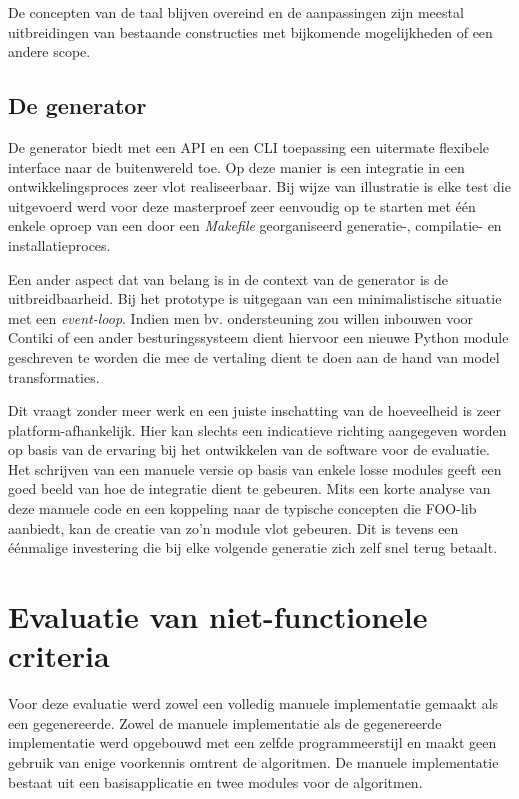 De concepten van de taal blijven overeind en de aanpassingen zijn meestal
uitbreidingen van bestaande constructies met bijkomende mogelijkheden of een
andere scope.

\vspace{-3mm}

\subsection{De generator}

De generator biedt met een API en een CLI toepassing een uitermate flexibele
interface naar de buitenwereld toe. Op deze manier is een integratie in een
ontwikkelingsproces zeer vlot realiseerbaar. Bij wijze van illustratie is elke
test die uitgevoerd werd voor deze masterproef zeer eenvoudig op te starten met
\'e\'en enkele oproep van een door een \emph{Makefile} georganiseerd
generatie-, compilatie- en installatieproces.

Een ander aspect dat van belang is in de context van de generator is de
uitbreidbaarheid. Bij het prototype is uitgegaan van een minimalistische
situatie met een \emph{event-loop}. Indien men bv. ondersteuning zou willen
inbouwen voor Contiki of een ander besturingssysteem dient hiervoor een nieuwe
Python module geschreven te worden die mee de vertaling dient te doen aan de
hand van model transformaties.

Dit vraagt zonder meer werk en een juiste inschatting van de hoeveelheid is
zeer platform-afhankelijk. Hier kan slechts een indicatieve richting aangegeven
worden op basis van de ervaring bij het ontwikkelen van de software voor de
evaluatie. Het schrijven van een manuele versie op basis van enkele losse
modules geeft een goed beeld van hoe de integratie dient te gebeuren. Mits een
korte analyse van deze manuele code en een koppeling naar de typische concepten
die FOO-lib aanbiedt, kan de creatie van zo'n module vlot gebeuren. Dit is
tevens een \'e\'enmalige investering die bij elke volgende generatie zich zelf
snel terug betaalt.

\vspace{-3mm}

\section{Evaluatie van niet-functionele criteria}
\label{section:evaluation-non-functionals}

Voor deze evaluatie werd zowel een volledig manuele implementatie gemaakt als
een gegenereerde. Zowel de manuele implementatie als de gegenereerde
implementatie werd opgebouwd met een zelfde programmeerstijl en maakt geen
gebruik van enige voorkennis omtrent de algoritmen. De manuele implementatie
bestaat uit een basisapplicatie en twee modules voor de algoritmen.

